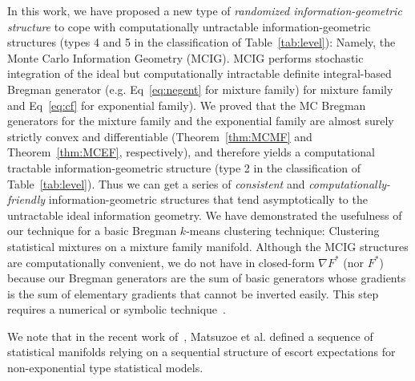 \documentclass[graybox]{svmult}
\def\tildeD{{\tilde{D}}}
\def\dmu{\mathrm{d}\mu}
\def\eqdef{:=}
\def\calX{\mathcal{X}}
\def\calM{\mathcal{M}}
\begin{document}
In this work, we have proposed a new type of {\em randomized
  information-geometric structure} to cope with computationally
untractable information-geometric structures (types 4 and 5 in the
classification of Table~\ref{tab:level}): Namely, the Monte Carlo Information Geometry (MCIG). MCIG  performs stochastic integration of the ideal but computationally intractable definite integral-based Bregman generator (e.g. Eq~\ref{eq:negent} for mixture family) for mixture family and Eq~\ref{eq:cf} for exponential family).
 We proved that the MC Bregman generators for the mixture family and the exponential family are almost surely strictly convex and differentiable (Theorem~\ref{thm:MCMF} and Theorem~\ref{thm:MCEF}, respectively), and  therefore yields a computational tractable information-geometric structure (type 2 in the classification of Table~\ref{tab:level}).
Thus we can get a series of {\em consistent} and {\em computationally-friendly} information-geometric structures that tend asymptotically to the untractable ideal information geometry.
We have demonstrated the usefulness of our technique for a basic Bregman $k$-means clustering technique: Clustering statistical mixtures on a mixture family manifold.
Although the MCIG structures are computationally convenient, we do not have in closed-form $\nabla F^*$ (nor $F^*$) because our Bregman generators are the sum of basic generators whose gradients is the sum of elementary gradients that cannot be inverted easily. This step requires a numerical or symbolic technique~\cite{SymbolicMonotoneOp-2017}.

We note that in the recent work of~\cite{matsuzoe-2017},  Matsuzoe et al. defined a sequence of statistical manifolds relying on a sequential structure of escort expectations for non-exponential type statistical models. 
%
\end{document}
